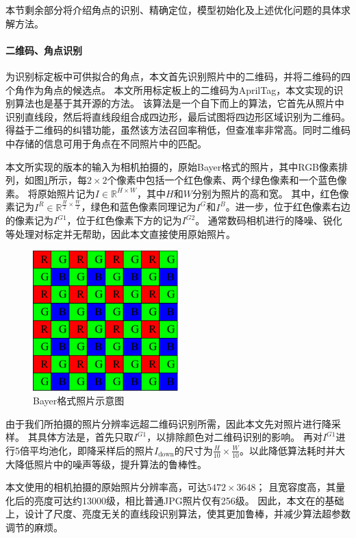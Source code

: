 本节剩余部分将介绍角点的识别、精确定位，模型初始化及上述优化问题的具体求解方法。

\paragraph{二维码、角点识别}为识别标定板中可供拟合的角点，本文首先识别照片中的二维码，并将二维码的四个角作为角点的候选点。
本文所用标定板上的二维码为AprilTag，本文实现的识别算法也是基于其开源的方法\cite{AprilTag}。
该算法是一个自下而上的算法，它首先从照片中识别直线段，然后将直线段组合成四边形，最后试图将四边形区域识别为二维码。得益于二维码的纠错功能，虽然该方法召回率稍低，但查准率非常高。同时二维码中存储的信息可用于角点在不同照片中的匹配。

本文所实现的版本的输入为相机拍摄的，原始Bayer格式的照片，其中RGB像素排列，如图\ref{fig:bayer}所示，每$2\times 2$个像素中包括一个红色像素、两个绿色像素和一个蓝色像素。
将原始照片记为$I\in \mathbb{R}^{H\times W}$，其中$H$和$W$分别为照片的高和宽。
其中，红色像素记为$I^R\in \mathbb{R}^{\frac{H}{2}\times \frac{W}{2}}$，绿色和蓝色像素同理记为$I^G$和$I^B$。进一步，位于红色像素右边的像素记为$I^{G1}$，位于红色像素下方的记为$I^{G2}$。
通常数码相机进行的降噪、锐化等处理对标定并无帮助，因此本文直接使用原始照片。

\begin{figure}
    \centering
    \includegraphics[width=0.5\textwidth]{figures/bayer}
    \caption{Bayer格式照片示意图}
    \label{fig:bayer}
\end{figure}

由于我们所拍摄的照片分辨率远超二维码识别所需，因此本文先对照片进行降采样。
其具体方法是，首先只取$I^{G1}$，以排除颜色对二维码识别的影响。
再对$I^{G1}$进行5倍平均池化，即降采样后的照片$I_{\text{down}}$的尺寸为$\frac{H}{10}\times \frac{W}{10}$。以此降低算法耗时并大大降低照片中的噪声等级，提升算法的鲁棒性。

本文使用的相机拍摄的原始照片分辨率高，可达$5472\times 3648$；
且宽容度高，其量化后的亮度可达约13000级，相比普通JPG照片仅有256级。
因此，本文在\cite{AprilTag}的基础上，设计了尺度、亮度无关的直线段识别算法，使其更加鲁棒，并减少算法超参数调节的麻烦。

